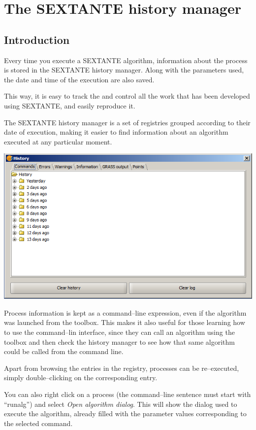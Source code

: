 \chapter{The SEXTANTE history manager}

\section {Introduction}

Every time you execute a SEXTANTE algorithm, information about the process is stored in the SEXTANTE history manager. Along with the parameters used, the date and time of the execution are also saved.

This way, it is easy to track the and control all the work that has been developed using SEXTANTE, and easily reproduce it.

The SEXTANTE history manager is a set of registries grouped according to their date of execution, making it easier to find information about an algorithm executed at any particular moment.

\begin{center}
\includegraphics[width=.4\columnwidth]{history.png}
\end{center}

Process information is kept as a command--line expression, even if the algorithm was launched from the toolbox. This makes it also useful for those learning how to use the command--lin interface, since they can call an algorithm using the toolbox and then check the history manager to see how that same algorithm could be called from the command line.

Apart from browsing the entries in the registry, processes can be re--executed, simply double--clicking on the corresponding entry.

You can also right click on a process (the command--line sentence must start with ``runalg'') and select \emph{Open algorithm dialog}. This will show the dialog used to execute the algorithm, already filled with the parameter values corresponding to the selected command.